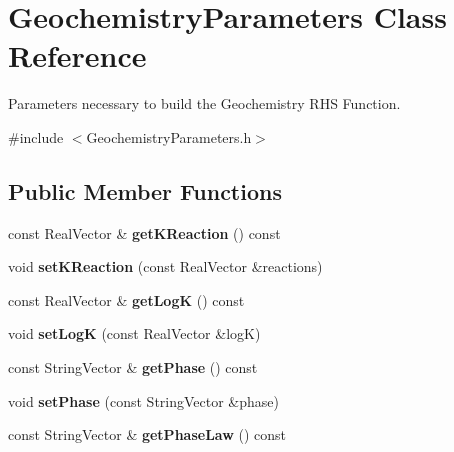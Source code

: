 \hypertarget{classGeochemistryParameters}{
\section{GeochemistryParameters Class Reference}
\label{classGeochemistryParameters}
}


Parameters necessary to build the Geochemistry RHS Function.  


{\ttfamily \#include $<$GeochemistryParameters.h$>$}\subsection*{Public Member Functions}
\begin{DoxyCompactItemize}
\item 
\hypertarget{classGeochemistryParameters_abe67b2fbbba26c71333d8dc5fa33ea17}{
const RealVector \& {\bfseries getKReaction} () const }
\label{classGeochemistryParameters_abe67b2fbbba26c71333d8dc5fa33ea17}

\item 
\hypertarget{classGeochemistryParameters_a519272ad201baee1c117b3471b7f7a4d}{
void {\bfseries setKReaction} (const RealVector \&reactions)}
\label{classGeochemistryParameters_a519272ad201baee1c117b3471b7f7a4d}

\item 
\hypertarget{classGeochemistryParameters_a8ed20d1f41db8f3c651e7ae9179e42a1}{
const RealVector \& {\bfseries getLogK} () const }
\label{classGeochemistryParameters_a8ed20d1f41db8f3c651e7ae9179e42a1}

\item 
\hypertarget{classGeochemistryParameters_a6cf912426641b20ca80f72d3b6d5c5d4}{
void {\bfseries setLogK} (const RealVector \&logK)}
\label{classGeochemistryParameters_a6cf912426641b20ca80f72d3b6d5c5d4}

\item 
\hypertarget{classGeochemistryParameters_aaf7f26a4a54c58f8a9b5d0f9e44226a3}{
const StringVector \& {\bfseries getPhase} () const }
\label{classGeochemistryParameters_aaf7f26a4a54c58f8a9b5d0f9e44226a3}

\item 
\hypertarget{classGeochemistryParameters_a2e1b7c736879949560195d02754fe466}{
void {\bfseries setPhase} (const StringVector \&phase)}
\label{classGeochemistryParameters_a2e1b7c736879949560195d02754fe466}

\item 
\hypertarget{classGeochemistryParameters_a05ba8a6df36d04cc63f2faa313d3b4c7}{
const StringVector \& {\bfseries getPhaseLaw} () const }
\label{classGeochemistryParameters_a05ba8a6df36d04cc63f2faa313d3b4c7}


\end{DoxyCompactItemize}
